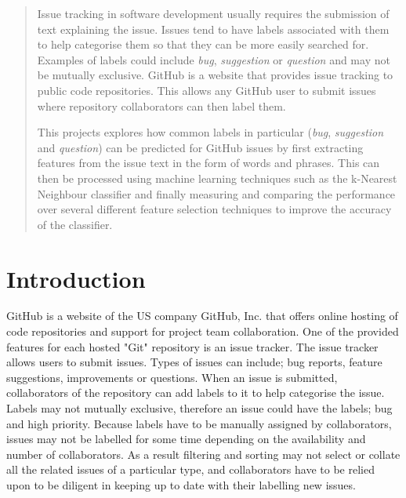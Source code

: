 \newcommand{\todo}[1]{
	\colorbox{light-gray}{
		\parbox{\linewidth}{
			\textbf{TODO} #1
		}
	}
}

\nocite{github}

\begin{abstract} 
Issue tracking in software development usually requires the submission of text explaining the issue. Issues tend to have labels
associated with them to help categorise them so that they can be more easily searched for. Examples of labels could include
\textit{bug}, \textit{suggestion} or \textit{question} and may not be mutually exclusive. GitHub is a website that provides
issue tracking to public code repositories. This allows any GitHub user to submit issues where repository collaborators can then
label them.

This projects explores how common labels in particular (\textit{bug}, \textit{suggestion} and \textit{question}) can be
predicted for GitHub issues by first extracting features from the issue text in the form of words and phrases. This can then be
processed using machine learning techniques such as the k-Nearest Neighbour classifier and finally measuring and comparing the
performance over several different feature selection techniques to improve the accuracy of the classifier.
\end{abstract}

\section{Introduction}
GitHub is a website of the US company GitHub, Inc. that offers online hosting of code repositories and support for project team
collaboration. One of the provided features for each hosted "Git" repository is an issue tracker. The issue tracker allows users
to submit issues. Types of issues can include; bug reports, feature suggestions, improvements or questions. When an issue is
submitted, collaborators of the repository can add labels to it to help categorise the issue. Labels may not mutually exclusive,
therefore an issue could have the labels; bug and high priority. Because labels have to be manually assigned by collaborators,
issues may not be labelled for some time depending on the availability and number of collaborators. As a result filtering and
sorting may not select or collate all the related issues of a particular type, and collaborators have to be relied upon to be
diligent in keeping up to date with their labelling new issues.

